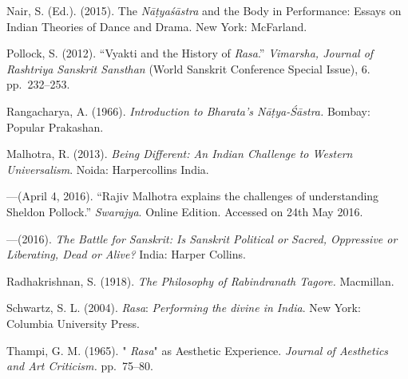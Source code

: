 \begin{thebibliography}{99}
Nair, S. (Ed.). (2015). The \textsl{Nāṭyaśāstra} and the Body in Performance: Essays on Indian Theories of Dance and Drama. New York: McFarland.

Pollock, S. (2012). “Vyakti and the History of \textsl{Rasa}.” \textsl{Vimarsha, Journal of Rashtriya Sanskrit Sansthan} (World Sanskrit Conference Special Issue), 6. pp.~232--253.

Rangacharya, A. (1966). \textsl{Introduction to Bharata's Nāṭya-Śāstra.} Bombay: Popular Prakashan.

Malhotra, R. (2013). \textsl{Being Different: An Indian Challenge to Western Universalism}. Noida: Harpercollins India.

---\kern3pt(April 4, 2016). “Rajiv Malhotra explains the challenges of understanding Sheldon Pollock.” \textsl{Swarajya}. Online Edition. Accessed on 24th May 2016.

---\kern3pt(2016). \textsl{The Battle for Sanskrit: Is Sanskrit Political or Sacred, Oppressive or Liberating, Dead or Alive?} India: Harper Collins.

Radhakrishnan, S. (1918). \textsl{The Philosophy of Rabindranath Tagore.} Macmillan. 

Schwartz, S. L. (2004). \textsl{Rasa}: \textsl{Performing the divine in India}. New York: Columbia University Press. 

Thampi, G. M. (1965). " \textsl{Rasa}" as Aesthetic Experience. \textsl{Journal of Aesthetics and Art Criticism.} pp.~75--80.
\end{thebibliography}

\newpage

\theendnotes 
